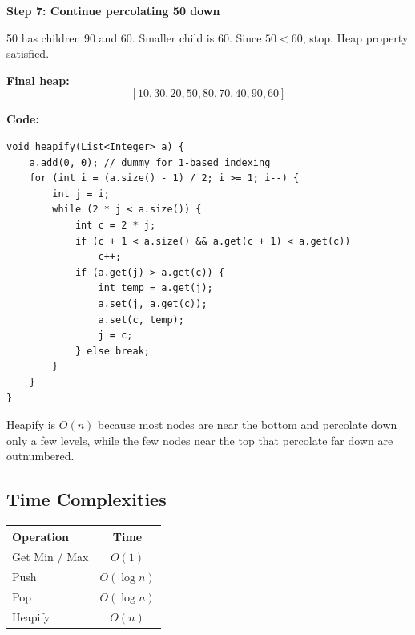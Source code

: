 \textbf{Step 7: Continue percolating 50 down}

50 has children 90 and 60. Smaller child is 60. Since $50 < 60$, stop. Heap property satisfied.

\textbf{Final heap:}
\[
[10,30,20,50,80,70,40,90,60]
\]
\begin{center}
\end{center}
\textbf{Code:}
\begin{verbatim}
void heapify(List<Integer> a) {
    a.add(0, 0); // dummy for 1-based indexing
    for (int i = (a.size() - 1) / 2; i >= 1; i--) {
        int j = i;
        while (2 * j < a.size()) {
            int c = 2 * j;
            if (c + 1 < a.size() && a.get(c + 1) < a.get(c))
                c++;
            if (a.get(j) > a.get(c)) {
                int temp = a.get(j);
                a.set(j, a.get(c));
                a.set(c, temp);
                j = c;
            } else break;
        }
    }
}
\end{verbatim}

Heapify is $O(n)$ because most nodes are near the bottom and percolate down only a few levels, while the few nodes near the top that percolate far down are outnumbered.

\subsection{Time Complexities}
\begin{center}
\begin{tabular}{l c}
\toprule
Operation & Time \\
\midrule
Get Min / Max & $O(1)$ \\
Push & $O(\log n)$ \\
Pop & $O(\log n)$ \\
Heapify & $O(n)$ \\
\bottomrule
\end{tabular}
\end{center}